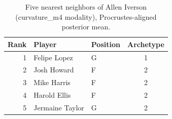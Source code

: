 \begin{table}[htbp]
  \centering\small
  \begin{tabular}{rllc}
    \toprule
    Rank & Player & Position & Archetype \\
    \midrule
    1 & Felipe Lopez & G & 1 \\
    2 & Josh Howard & F & 2 \\
    3 & Mike Harris & F & 2 \\
    4 & Harold Ellis & F & 2 \\
    5 & Jermaine Taylor & G & 2 \\
    \bottomrule
  \end{tabular}
  \caption{Five nearest neighbors of Allen Iverson (curvature_m4 modality), Procrustes-aligned posterior mean.}
  \label{tab:Allen_Iverson_neighbors_curvature_m4}
\end{table}

